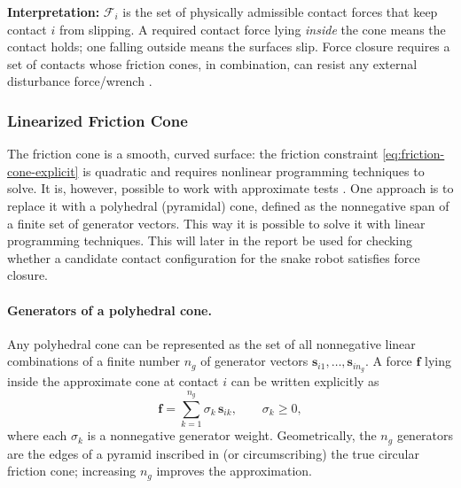 \textbf{Interpretation:} $\mathcal{F}_i$ is the set of physically admissible
contact forces that keep contact $i$ from slipping. A required contact force
lying \emph{inside} the cone means the contact holds; one falling outside
means the surfaces slip. Force closure requires a set of contacts whose
friction cones, in combination, can resist any external disturbance
force/wrench \cite[p.~685]{prattichizzo2008grasping}.

\subsubsection{Linearized Friction Cone}
\label{sec:linearized-cone}

The friction cone is a smooth, curved surface: the friction constraint
\eqref{eq:friction-cone-explicit} is quadratic and requires nonlinear
programming techniques to solve. It is, however, possible to work with
approximate tests \cite[p.~686]{prattichizzo2008grasping}. One approach is to
replace it with a polyhedral (pyramidal) cone, defined as the nonnegative
span of a finite set of generator vectors. This way it is possible to solve
it with linear programming techniques. This will later in the report be used
for checking whether a candidate contact configuration for the snake robot
satisfies force closure.

\paragraph{Generators of a polyhedral cone.}
Any polyhedral cone can be represented as the set of all nonnegative linear
combinations of a finite number $n_g$ of generator vectors
$\mathbf{s}_{i1}, \dots, \mathbf{s}_{i n_g}$. A force $\mathbf{f}$ lying
inside the approximate cone at contact $i$ can be written explicitly as
\begin{equation}
    \mathbf{f} = \sum_{k=1}^{n_g} \sigma_k \, \mathbf{s}_{ik}, \qquad \sigma_k \ge 0 ,
    \label{eq:generator-combination}
\end{equation}
where each $\sigma_k$ is a nonnegative generator weight. Geometrically, the
$n_g$ generators are the edges of a pyramid inscribed in (or circumscribing)
the true circular friction cone; increasing $n_g$ improves the
approximation.


